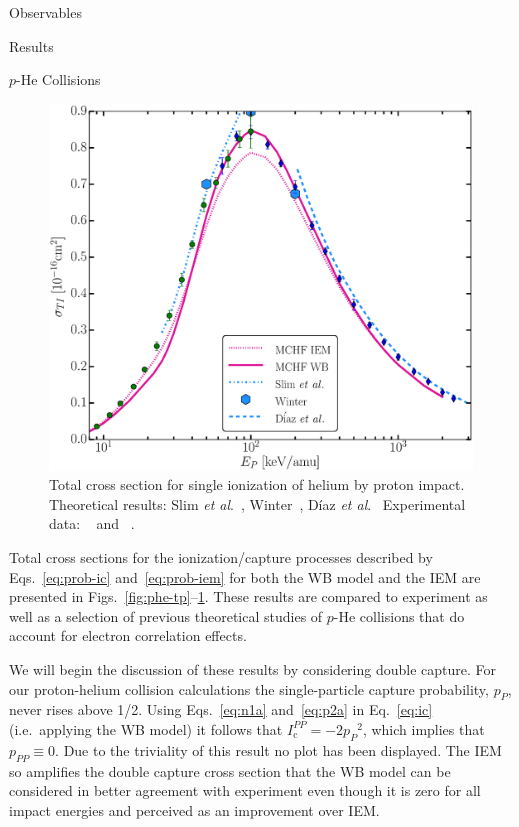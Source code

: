 \documentclass[letterpaper, 11 pt]{report}
\begin{document}
\begin{chapter}{Observables \label{chap:p-he2p-he}}
\begin{section}{Results \label{sec:phe2p-res}}
\begin{subsection}{\texorpdfstring{$p$}{p}-He Collisions \label{sec:phe-res}}
\begin{figure}[ht]
\begin{minipage}{.49\linewidth}
               \centering
               \includegraphics[width = \linewidth]{./images/phe/phe-TI.eps}
               \caption[Total cross section for single ionization of helium by proton impact.]
                       {Total cross section for single ionization of helium by proton impact.
                        Theoretical results: Slim \textit{et al}.~\cite{SHBF-91},
                        Winter~\cite{Winter-91}, D\'{i}az \textit{et al}.~\cite{DMS-00}
                        Experimental data: {\color{OliveGreen}{$\bullet$}}~\cite{SG89} and
                        {\color{blue}{$\blacklozenge$}}~\cite{SG85}. \label{fig:phe-ti}}
            \end{minipage}
         \end{figure}

         Total cross sections for the ionization/capture processes described by Eqs.~\eqref{eq:prob-ic}
         and~\eqref{eq:prob-iem} for both the WB model and the IEM are presented in
         Figs.~\ref{fig:phe-tp}--\ref{fig:phe-ti}. These results are compared to experiment as well as a
         selection of previous theoretical studies of $p$-He collisions that do account for electron
         correlation effects.

         We will begin the discussion of these results by considering double capture. For our
         proton-helium collision calculations the single-particle capture probability, $p_P$, never
         rises above 1/2. Using Eqs.~\eqref{eq:n1a} and~\eqref{eq:p2a} in Eq.~\eqref{eq:ic} (i.e.\
         applying the WB model) it follows that $I^{PP}_\mathrm{c} = -2 {p_P}^2$, which implies that
         $p_{PP} \equiv 0$. Due to the triviality of this result no plot has been displayed. The IEM so
         amplifies the double capture cross section that the WB model can be considered in better
         agreement with experiment even though it is zero for all impact energies and perceived as an
         improvement over IEM.


\end{subsection}
\end{section}
\end{chapter}
\end{document}
